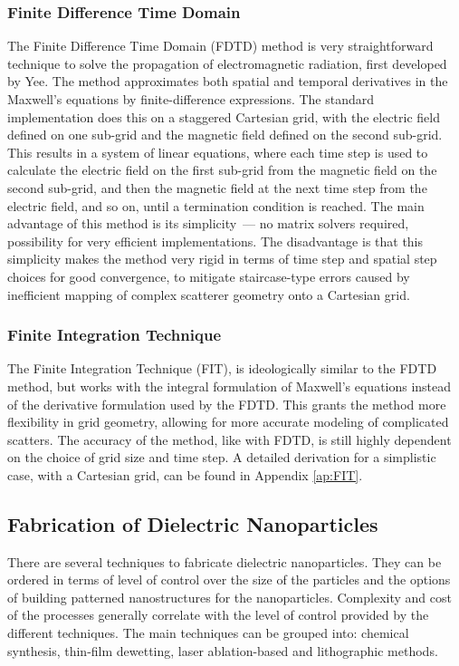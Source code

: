         \subsubsection{Finite Difference Time Domain}
                The Finite Difference Time Domain (FDTD) method is very straightforward technique to solve the propagation of electromagnetic
            radiation, first developed by Yee\cite{yee1966numerical}. The method approximates both spatial and temporal derivatives in the Maxwell's
            equations by finite-difference expressions. The standard implementation does this on a staggered Cartesian grid, with the electric field
            defined on one sub-grid and the magnetic field defined on the second sub-grid. This results in a system of linear equations, where
            each time step is used to calculate the electric field on the first sub-grid from the magnetic field on the second sub-grid, and then
            the magnetic field at the next time step from the electric field, and so on, until a termination condition is reached.
                The main advantage of this method is its simplicity~--- no matrix solvers required, possibility for very efficient implementations.
            The disadvantage is that this simplicity makes the method very rigid in terms of time step and spatial step choices for good convergence,
            to mitigate staircase-type errors caused by inefficient mapping of complex scatterer geometry onto a Cartesian grid.

        \subsubsection{Finite Integration Technique}
                The Finite Integration Technique (FIT)\cite{wieland1977discretization}, is ideologically similar to the FDTD method, but works with the
            integral formulation of Maxwell's equations instead of the derivative formulation used by the FDTD. This grants the method more flexibility
            in grid geometry, allowing for more accurate modeling of complicated scatters. The accuracy of the method, like with FDTD,
            is still highly dependent on the choice of grid size and time step.
                A detailed derivation for a simplistic case, with a Cartesian grid, can be found in Appendix \ref{ap:FIT}.

    \subsection{Fabrication of Dielectric Nanoparticles}
            There are several techniques to fabricate dielectric nanoparticles. They can be ordered in terms of level of control over the size
        of the particles and the options of building patterned nanostructures for the nanoparticles. Complexity and cost of the processes generally
        correlate with the level of control provided by the different techniques.
            The main techniques can be grouped into: chemical synthesis\cite{shi2012new}, thin-film dewetting\cite{abbarchi2014wafer},
        laser ablation-based\cite{zywietz2014laser} and lithographic methods.

